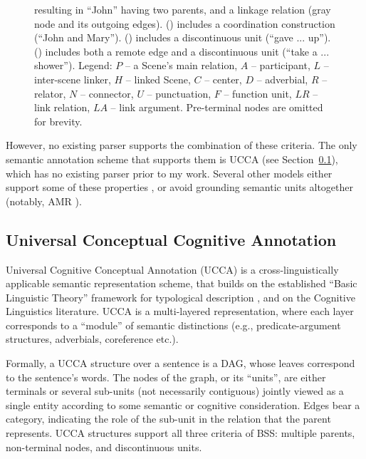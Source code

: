 \documentclass[12pt]{article}
\newcommand{\secref}[1]{Section~\ref{#1}}
\begin{document}
\begin{figure}[ht!]
{    resulting in ``John'' having two parents, and a linkage relation (gray node and its outgoing edges).
    () includes a coordination construction (``John and Mary'').
    () includes a discontinuous unit (``gave ... up'').
    () includes both a remote edge and a discontinuous unit (``take a ... shower'').
    Legend: $P$ -- a Scene's main relation, $A$ -- participant,
    $L$ -- inter-scene linker, $H$ -- linked Scene, $C$ -- center, $D$ -- adverbial,
    $R$ -- relator, $N$ -- connector, $U$ -- punctuation, $F$ -- function unit,
    $LR$ -- link relation, $LA$ -- link argument.
    Pre-terminal nodes are omitted for brevity.
  }
\end{figure}

However, no existing parser supports the combination of these criteria.
The only semantic annotation scheme that supports them is UCCA (see \secref{sec:ucca}),
which has no existing parser prior to my work.
Several other models either support some of these properties \cite{oepen2015semeval},
or avoid grounding semantic units altogether
(notably, AMR \cite{banarescu2013abstract}).

\subsection{Universal Conceptual Cognitive Annotation}\label{sec:ucca}
Universal Cognitive Conceptual Annotation (UCCA)
is a cross-linguistically applicable semantic representation scheme,
that builds on the established ``Basic Linguistic Theory'' framework for typological description
\cite{Dixon:10b,Dixon:10a,Dixon:12}, and on the Cognitive Linguistics literature.
UCCA is a multi-layered representation, where each layer corresponds to a ``module'' of
semantic distinctions (e.g., predicate-argument structures, adverbials, coreference etc.).

Formally, a UCCA structure over a sentence is a DAG, whose leaves correspond to the sentence's words.
The nodes of the graph, or its ``units'', are either terminals or several
sub-units (not necessarily contiguous) jointly viewed as a
single entity according to some semantic or cognitive consideration.
Edges bear a category, indicating the role of the sub-unit in the relation that the parent represents.
UCCA structures support all three criteria of BSS: multiple parents, non-terminal nodes, and
discontinuous units.
\end{document}
